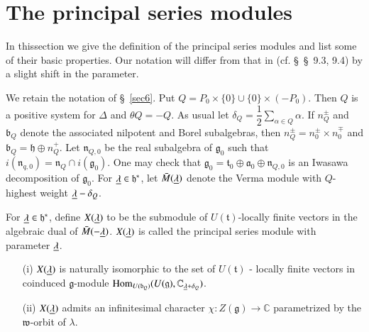  
\chapter{The principal series modules}\label{sec8}

In this\pageoriginale section we give the definition of the principal
series modules and list some of their basic properties. Our notation
will differ from that in \cite{key8} (cf. \S\ \S\ 9.3, 9.4) by a slight 
shift in the parameter.


We retain the notation of \S\ \ref{sec6}. Put $Q = P_0 \times \{0\} \cup \{0\}
\times (-P_0)$. Then $Q$ is a positive system for $\Delta$ and $\theta
Q = - Q$. As usual let $\delta_Q = \dfrac{1}{2} \sum\limits_{\alpha
  \in Q} \alpha$. If $n^{\pm}_Q$ and $\mathfrak{b}_Q$ denote the
associated nilpotent and Borel subalgebras, then $n^\pm_Q = n^{\pm}_0
\times n^{\mp}_0$ and $\mathfrak{b}_Q = \mathfrak{h} \oplus
n^+_Q$. Let $\mathfrak{n}_{Q,0}$ be the real subalgebra of
$\mathfrak{g}_0$ such that $i(\mathfrak{n}_{q,0}) = \mathfrak{n}_Q
\cap i (\mathfrak{g}_0)$. One  may check that $\mathfrak{g}_0 =
\mathfrak{t}_0 \oplus \mathfrak{a}_0 \oplus \mathfrak{n}_{Q,0}$ is an
Iwasawa decomposition of $\mathfrak{g}_0$. For $\underline{\lambda} \in
\mathfrak{h}^*$, let $\bar{M}(\underline{\lambda})$ denote the Verma module
with $Q$-highest weight $\underline{\lambda} - \delta_Q$. 

\begin{definition}\label{chap8:def8.1}
For $\underline{\lambda} \in \mathfrak{h}^*$, define $X(\underline{\lambda})$ to be
the submodule of $U(\mathfrak{t})$-locally finite vectors in the
algebraic dual of $\bar{M}(-\underline{\lambda})$. $X(\underline{\lambda})$ is called
the principal series module with parameter $\underline{\lambda}$. 
\end{definition}


\begin{remarks}\label{chap8:rem8.2}
\begin{itemize}
\item[{\rm (i)}]  $X(\underline{\lambda})$ is naturally isomorphic to the set
  of $U(\mathfrak{t})$ - locally finite vectors in coinduced
  $\mathfrak{g}$-module $\Hom_{U(\mathfrak{b}_Q)} (U(\mathfrak{g}),\break
  \mathbb{C}_{\u{\lambda} + \delta_Q})$.

\item[{\rm (ii)}] $X(\underline{\lambda})$ admits an infinitesimal character
  $\chi: Z(\mathfrak{g}) \to \mathbb{C}$ parametrized by the
  $\mathfrak{w}$-orbit of $\mathfrak{\lambda}$. 
\end{itemize}
\end{remarks}

